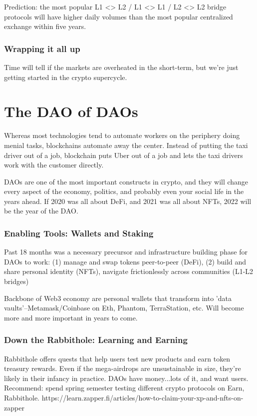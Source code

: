\documentclass{../notes}
\begin{document}
Prediction: the most popular L1 <> L2 / L1 <> L1 / L2 <> L2 bridge protocols will have higher daily volumes than the most popular centralized exchange within five years.

\section{Wrapping it all up}
Time will tell if the markets are overheated in the short-term, but we’re just getting started in the crypto supercycle.

\part{The DAO of DAOs}
Whereas most technologies tend to automate workers on the periphery doing menial tasks, blockchains automate away the center. Instead of putting the taxi driver out of a job, blockchain puts Uber out of a job and lets the taxi drivers work with the customer directly.

DAOs are one of the most important constructs in crypto, and they will change every aspect of the economy, politics, and probably even your social life in the years ahead. If 2020 was all about DeFi, and 2021 was all about NFTs, 2022 will be the year of the DAO.

\section{Enabling Tools: Wallets and Staking}
Past 18 months was a necessary precursor and infrastructure building phase for DAOs to work: (1) manage and swap tokens peer-to-peer (DeFi), (2) build and share personal identity (NFTs), navigate frictionlessly across communities (L1-L2 bridges)

Backbone of Web3 economy are personal wallets that transform into 'data vaults'--Metamask/Coinbase on Eth, Phantom, TerraStation, etc. Will become more and more important in years to come. 

\section{Down the Rabbithole: Learning and Earning}
Rabbithole offers quests that help users test new products and earn token treasury rewards. Even if the mega-airdrops are unsustainable in size, they’re likely in their infancy in practice. DAOs have money...lots of it, and want users. Recommend: spend spring semester testing different crypto protocols on Earn, Rabbithole. 
https://learn.zapper.fi/articles/how-to-claim-your-xp-and-nfts-on-zapper
\end{document}
